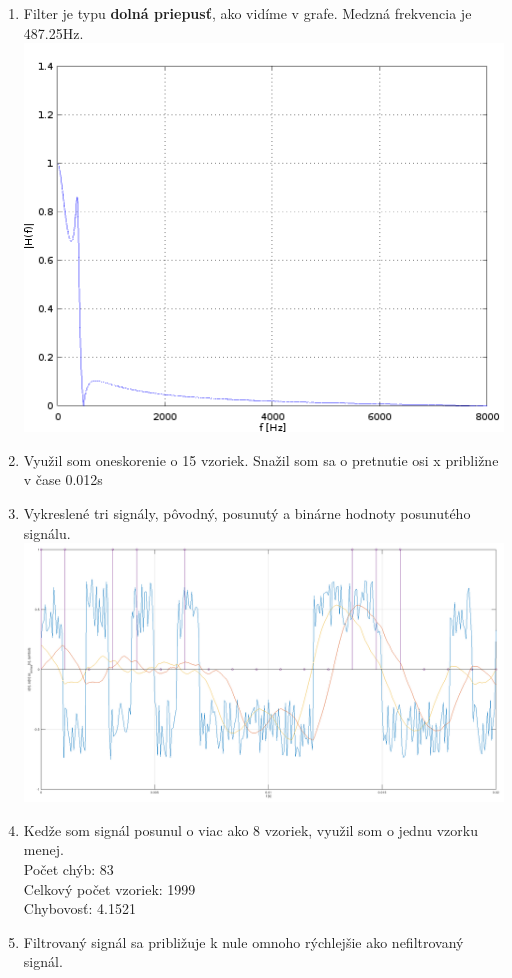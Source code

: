 \documentclass[a4paper,12pt,twocolumn]{article}
\begin{document}
\begin{enumerate}
\newpage
\item
Filter je typu \textbf{dolná priepusť}, ako vidíme v grafe. Medzná frekvencia je 487.25Hz.
\includegraphics[width=\linewidth]{4}
\item
Využil som oneskorenie o 15 vzoriek. Snažil som sa o pretnutie osi x približne v čase 0.012s
\item
Vykreslené tri signály, pôvodný, posunutý a binárne hodnoty posunutého signálu.
\includegraphics[width=\linewidth]{6}
\item
Kedže som signál posunul o viac ako 8 vzoriek, využil som o jednu vzorku menej.\\
Počet chýb: 83\\
Celkový počet vzoriek: 1999\\
Chybovosť: 4.1521
\newpage
\item
Filtrovaný signál sa približuje k nule omnoho rýchlejšie ako nefiltrovaný signál.

\end{enumerate}
\end{document}
